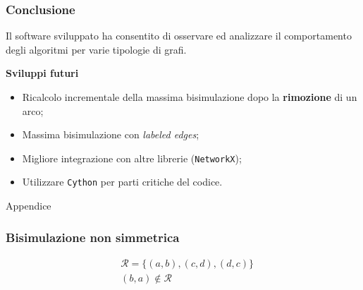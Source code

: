 \documentclass{beamer}
\begin{document}
\begin{frame}\frametitle{Conclusione}
    Il software sviluppato ha consentito di osservare ed analizzare il comportamento degli algoritmi per varie tipologie di grafi.

    \bigskip\bigskip

    \textbf{Sviluppi futuri}
    \begin{itemize}
        \item Ricalcolo incrementale della massima bisimulazione dopo la \textbf{rimozione} di un arco;
        \item Massima bisimulazione con \emph{labeled edges};
        \item Migliore integrazione con altre librerie (\texttt{NetworkX});
        \item Utilizzare \texttt{Cython} per parti critiche del codice.
    \end{itemize}
\end{frame}

\begin{frame}
    Appendice
\end{frame}

\begin{frame}\frametitle{Bisimulazione non simmetrica}
    \begin{figure}[t]
        \centering
    \end{figure}

    \begin{align*}
        &\mathcal{R} = \{(a,b), (c,d), (d,c)\}\\
        &(b,a) \not\in \mathcal{R}
    \end{align*}
\end{frame}
\end{document}
